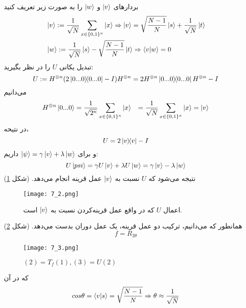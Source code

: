  بردارهای $\ket{v}$ و $\ket{w}$ را به صورت زیر تعریف کنید
 \begin{equation}
 \begin{split}
 & \ket{v} := \frac{1}{\sqrt{N}} \sum_{x \in \{0,1\}^{n}} \ket{x} \Rightarrow \ket{v} = \sqrt{\frac{N-1}{N}} \ket{s} + \frac{1}{\sqrt{N}} \ket{t} \\
 & \ket{w} :=  \frac{1}{\sqrt{N}} \ket{s} - \sqrt{\frac{N-1}{N}} \ket{t} \Rightarrow \braket{v}{w} = 0
 \end{split}
 \end{equation}
 تبدیل یکانی $U$ را در نظر بگیرید:
 \begin{equation}
 	U := H^{\otimes n}(2\dyad{0...0}{0...0} - I)H^{\otimes n} = 2H^{\otimes n}\dyad{0...0}{0...0}H^{\otimes n} - I
 \end{equation}
 می‌دانیم 
  \begin{equation}
  \begin{split}
  	& H^{\otimes n}\ket{0...0} = \frac{1}{\sqrt{2^{n}}} \sum_{x \in \{0,1\}^{n}} \ket{x} 
  	& = \frac{1}{\sqrt{N}} \sum_{x \in \{0,1\}^{n}} \ket{x} = \ket{v}
  \end{split}
  \end{equation}
  در نتیحه،
  \begin{equation}
  	U = 2\dyad{v}{v} - I
  \end{equation}
  و برای 
  $\ket{\psi} = \gamma\ket{v} + \lambda\ket{w}$ 
  داریم:
   \begin{equation}
   	U\ket{psi} = \gamma U \ket{v} + \lambda U \ket{w} = \gamma\ket{v} - \lambda\ket{w}
   \end{equation}
  نتیجه می‌شود که $U$ نسبت به $\ket{v}$ عمل قرینه انجام می‌دهد. (شکل \ref{fig:7-2})
\begin{figure}[h]
	\caption{ اعمال $U$ که در واقع عمل قرینه‌کردن نسبت به $\ket{v}$ است.}
	\centering
	\texttt{[image: 7\_2.png]}
	\label{fig:7-2}
\end{figure}

همانطور که می‌دانیم، ترکیب دو عمل قرینه، یک عمل دوران بدست می‌دهد. (شکل \ref{fig:7-3})
\begin{equation}
{f} = R_{2\theta}
\end{equation}
\begin{figure}[h]
	\caption{ $(2) = T_{f}(1), (3) = U(2)$}
	\centering
	\texttt{[image: 7\_3.png]}
	\label{fig:7-3}
\end{figure}
که در آن 
\begin{equation}
	cos \theta = \braket{v}{s} = \sqrt{\frac{N-1}{N}} \Rightarrow \theta \approx	\frac{1}{\sqrt{N}}
\end{equation}
